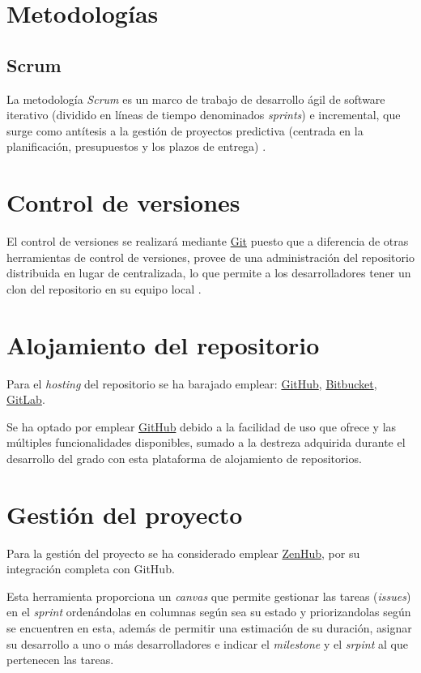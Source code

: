 
\section{Metodologías}
\subsection{Scrum}
La metodología \textit{Scrum} es un marco de trabajo de desarrollo ágil de software
iterativo (dividido en líneas de tiempo denominados \textit{sprints}) e incremental, 
que surge como antítesis a la gestión de proyectos predictiva (centrada en la planificación,
presupuestos y los plazos de entrega) \cite{enwiki:scrum2023,book:palacio2021}.

\section{Control de versiones}
El control de versiones se realizará mediante \href{https://git-scm.com/}{Git} puesto que a 
diferencia de otras herramientas de control de versiones, provee de una administración del
repositorio distribuida en lugar de centralizada, lo que permite a los desarrolladores
tener un clon del repositorio en su equipo local \cite{git:2023}. 

\section{Alojamiento del repositorio}
Para el \textit{hosting} del repositorio se ha barajado emplear: \href{https://github.com/}{GitHub}, 
        \href{https://bitbucket.org/product/es/}{Bitbucket},
        \href{https://about.gitlab.com/}{GitLab}.

Se ha optado por emplear \href{https://github.com/}{GitHub} debido a la facilidad de uso
que ofrece y las múltiples funcionalidades disponibles, sumado a la destreza adquirida
durante el desarrollo del grado con esta plataforma de alojamiento de repositorios.

\section{Gestión del proyecto}
Para la gestión del proyecto se ha considerado emplear \href{https://www.zenhub.com/}{ZenHub},
por su integración completa con GitHub.

Esta herramienta proporciona un \textit{canvas} que permite gestionar las 
tareas (\textit{issues}) en el \textit{sprint} ordenándolas en columnas según sea su 
estado y priorizandolas según se encuentren en esta, además de permitir una 
estimación de su duración, asignar su desarrollo a uno o más
desarrolladores e indicar el \textit{milestone} y el \textit{srpint} al que pertenecen
las tareas.


